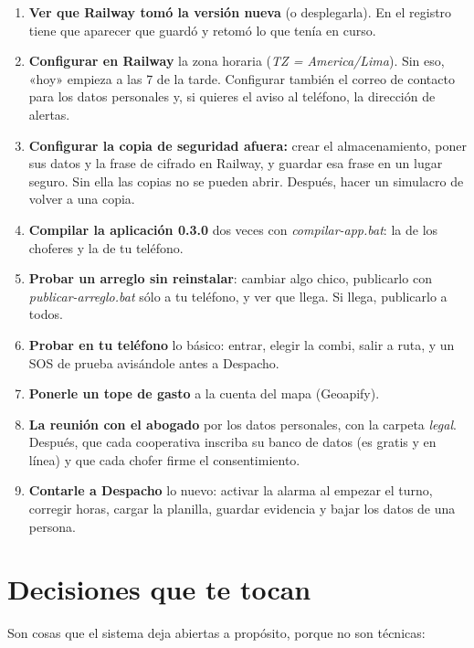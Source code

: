 \documentclass[12pt,a4paper]{article}
\begin{document}
\begin{enumerate}[leftmargin=1.5em]
  \item \textbf{Ver que Railway tomó la versión nueva} (o desplegarla).
  En el registro tiene que aparecer que guardó y retomó lo que tenía en
  curso.
  \item \textbf{Configurar en Railway} la zona horaria (\emph{TZ =
  America/Lima}). Sin eso, «hoy» empieza a las 7 de la tarde. Configurar
  también el correo de contacto para los datos personales y, si quieres el
  aviso al teléfono, la dirección de alertas.
  \item \textbf{Configurar la copia de seguridad afuera:} crear el
  almacenamiento, poner sus datos y la frase de cifrado en Railway, y
  guardar esa frase en un lugar seguro. Sin ella las copias no se pueden
  abrir. Después, hacer un simulacro de volver a una copia.
  \item \textbf{Compilar la aplicación 0.3.0} dos veces con
  \emph{compilar-app.bat}: la de los choferes y la de tu teléfono.
  \item \textbf{Probar un arreglo sin reinstalar}: cambiar algo chico,
  publicarlo con \emph{publicar-arreglo.bat} sólo a tu teléfono, y ver que
  llega. Si llega, publicarlo a todos.
  \item \textbf{Probar en tu teléfono} lo básico: entrar, elegir la combi,
  salir a ruta, y un SOS de prueba avisándole antes a Despacho.
  \item \textbf{Ponerle un tope de gasto} a la cuenta del mapa (Geoapify).
  \item \textbf{La reunión con el abogado} por los datos personales, con la
  carpeta \emph{legal}. Después, que cada cooperativa inscriba su banco de
  datos (es gratis y en línea) y que cada chofer firme el consentimiento.
  \item \textbf{Contarle a Despacho} lo nuevo: activar la alarma al empezar el
  turno, corregir horas, cargar la planilla, guardar evidencia y bajar los
  datos de una persona.
\end{enumerate}

\section{Decisiones que te tocan}

Son cosas que el sistema deja abiertas a propósito, porque no son técnicas:
\end{document}
